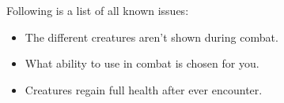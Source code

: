 Following is a list of all known issues:
\begin{itemize}[$\circ$]
	\item The different creatures aren't shown during combat.
	\item What ability to use in combat is chosen for you.
	\item Creatures regain full health after ever encounter.
\end{itemize}